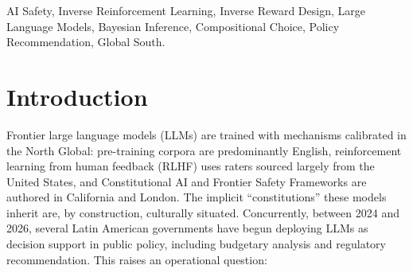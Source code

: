 \documentclass[conference]{IEEEtran}
\begin{document}
\begin{abstract}
($p<10^{-4}$, paired Wilcoxon). Against a human-process anchor (B3)
instantiated as the Guatemalan MINFIN 2024 executed budget, the
direction \emph{reverses}: Claude is closer to the human process
(median $L_1{=}59.1$ pp) than GPT-4o-mini ($60.6$ pp, $p{=}0.0003$),
ruling out a single-axis ranking of the two models. Across thirteen pre-specified paired
Wilcoxon comparisons between Claude and GPT-4o-mini, eleven reject
the null at $\alpha{=}0.05$, nine survive Holm--Bonferroni
multiplicity correction, and seven hold at $p<0.001$. We additionally report a lexical proxy for
reasoning--action coherence: Claude is flagged in seven of twenty
seeds versus zero for GPT-4o-mini at the default cosine threshold,
and the cross-model direction persists under two independent text
encodings and a threshold sweep, but we report it as a screening
signal, not a faithfulness verdict. All claims are bounded \emph{under
this instrumentation}; harm magnitudes are translated consequences
under the calibrated simulator, not predictions of real-world policy
outcomes.
The method is country-agnostic and reusable; each additional country
is a new calibration dataset, not a new methodology.
\end{abstract}

\begin{IEEEkeywords}
AI Safety, Inverse Reinforcement Learning, Inverse Reward Design,
Large Language Models, Bayesian Inference, Compositional Choice,
Policy Recommendation, Global South.
\end{IEEEkeywords}

\section{Introduction}

Frontier large language models (LLMs) are trained with mechanisms
calibrated in the North Global: pre-training corpora are predominantly
English, reinforcement learning from human feedback (RLHF) uses raters
sourced largely from the United States, and Constitutional AI and
Frontier Safety Frameworks are authored in California and London. The
implicit ``constitutions'' these models inherit are, by construction,
culturally situated. Concurrently, between 2024 and 2026, several
Latin American governments have begun deploying LLMs as decision
support in public policy, including budgetary analysis and regulatory
recommendation. This raises an operational question:
\end{document}
